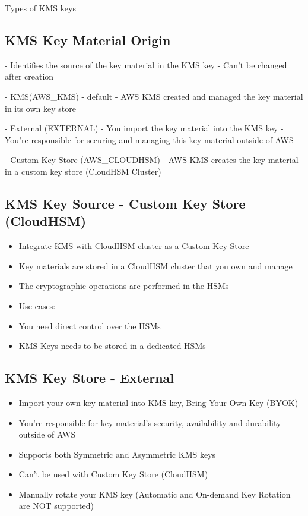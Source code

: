 Types of KMS keys

\subsection{KMS Key Material Origin}
- Identifies the source of the key material in the KMS key
- Can't be changed after creation

- KMS(AWS_KMS) - default
- AWS KMS created and managed the key material in its own key store

- External (EXTERNAL)
- You import the key material into the KMS key
- You're responsible for securing and managing this key material outside of AWS

- Custom Key Store (AWS_CLOUDHSM)
- AWS KMS creates the key material in a custom key store (CloudHSM Cluster)

\subsection{KMS Key Source - Custom Key Store (CloudHSM)}
\begin{itemize}
    \item Integrate KMS with CloudHSM cluster as a Custom Key Store
    \item Key materials are stored in a CloudHSM cluster that you own and manage
    \item The cryptographic operations are performed in the HSMs
    \item Use cases:
    \item You need direct control over the HSMs
    \item KMS Keys needs to be stored in a dedicated HSMs
\end{itemize}

\subsection{KMS Key Store - External}
\begin{itemize}
    \item Import your own key material into KMS key, Bring Your Own Key (BYOK)
    \item You're responsible for key material's security, availability and durability outside of AWS
    \item Supports both Symmetric and Asymmetric KMS keys
    \item Can't be used with Custom Key Store (CloudHSM)
    \item Manually rotate your KMS key (Automatic and On-demand Key Rotation are NOT supported)
\end{itemize}

